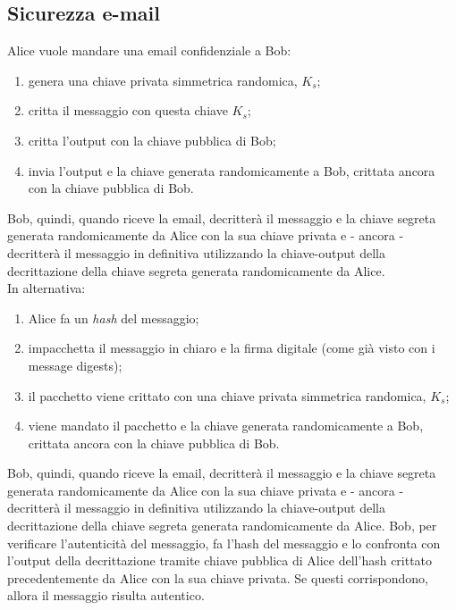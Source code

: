 \subsection{Sicurezza e-mail}
Alice vuole mandare una email confidenziale a Bob:
\begin{enumerate}
	\item genera una chiave privata simmetrica randomica, $K_{s}$;
	\item critta il messaggio con questa chiave $K_{s}$;
	\item critta l'output con la chiave pubblica di Bob;
	\item invia l'output e la chiave generata randomicamente a Bob, crittata ancora con la chiave pubblica di Bob.
\end{enumerate}
Bob, quindi, quando riceve la email, decritterà il messaggio e la chiave segreta generata randomicamente da Alice con la sua chiave privata e - ancora - decritterà il messaggio in definitiva utilizzando la chiave-output della decrittazione della chiave segreta generata randomicamente da Alice. \\
In alternativa:
\begin{enumerate}
	\item Alice fa un \textit{hash} del messaggio;
	\item impacchetta il messaggio in chiaro e la firma digitale (come già visto con i message digests);
	\item il pacchetto viene crittato con una chiave privata simmetrica randomica, $K_{s}$;
	\item viene mandato il pacchetto e la chiave generata randomicamente a Bob, crittata ancora con la chiave pubblica di Bob.
\end{enumerate}
Bob, quindi, quando riceve la email, decritterà il messaggio e la chiave segreta generata randomicamente da Alice con la sua chiave privata e - ancora - decritterà il messaggio in definitiva utilizzando la chiave-output della decrittazione della chiave segreta generata randomicamente da Alice. Bob, per verificare l'autenticità del messaggio, fa l'hash del messaggio e lo confronta con l'output della decrittazione tramite chiave pubblica di Alice dell'hash crittato precedentemente da Alice con la sua chiave privata. Se questi corrispondono, allora il messaggio risulta autentico.

